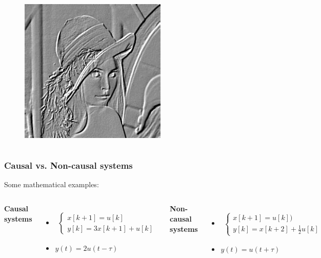 \documentclass{beamer}
\begin{document}
\begin{frame}
\begin{columns}
			\begin{figure}
				\includegraphics[width=.5\linewidth]{highlight}
			\end{figure}
			\vspace{-4ex}
			
		\end{columns}
	\end{frame}
	
	
	\begin{frame}
		\frametitle{Causal vs. Non-causal systems}
		\vspace{-6ex}
		Some mathematical examples:\\
		\bigskip
		\begin{columns}
			\textbf{Causal systems}\\
			\begin{itemize}
				\item \begin{align*}
				\begin{cases}
				x[k+1] = u[k]\\
				y[k] = 3 x [k+1] + u[k]
				\end{cases}
				\end{align*}
				\item $y(t) = 2 u(t-\tau)$
			\end{itemize}
			
			\textbf{Non-causal systems}\\
			\begin{itemize}
				\item \begin{align*}
				\begin{cases}
				x[k+1] = u[k])\\
				y[k] = x[k+2] + \frac{1}{2}u[k]
				\end{cases}
				\end{align*}
				\item $y(t) = u(t + \tau)$
			\end{itemize}
			
		\end{columns}
	\end{frame}
	
\end{document}
